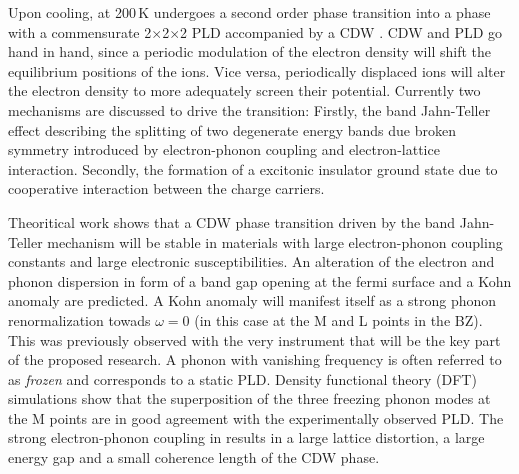 Upon cooling, at 200\,K \cite{disalvo1976} \ts\space undergoes a second order phase transition into a phase with a commensurate 2$\times$2$\times$2 \ac{PLD} accompanied by a \ac{CDW} \cite{rossnagel2011}.
\ac{CDW} and \ac{PLD} go hand in hand, since a periodic modulation of the electron density will shift the equilibrium positions of the ions.
Vice versa, periodically displaced ions will alter the electron density to more adequately screen their potential.
Currently two mechanisms are discussed to drive the transition: 
Firstly, the band Jahn-Teller effect describing the splitting of two degenerate energy bands due broken symmetry introduced by electron-phonon coupling and electron-lattice interaction\cite{JT}.
Secondly, the formation of a excitonic insulator ground state due to cooperative interaction between the charge carriers\cite{EI}.

Theoritical work shows that a \ac{CDW} phase transition driven by the band Jahn-Teller mechanism will be stable in materials with large electron-phonon coupling constants and large electronic susceptibilities\cite{friend1979}.
An alteration of the electron and phonon dispersion in form of a band gap opening at the fermi surface and a Kohn anomaly are predicted.
A Kohn anomaly will manifest itself as a strong phonon renormalization towads $\omega=0$\cite{kohn1959} (in this case at the M and L points in the \ac{BZ}).
This was previously observed with the very instrument that will be the key part of the proposed research\cite{otto2021}.
A phonon with vanishing frequency is often referred to as \emph{frozen} and corresponds to a static \ac{PLD}.
Density functional theory (DFT) simulations show that the superposition of the three freezing phonon modes at the M points are in good agreement with the experimentally observed \ac{PLD}\cite{kaneko2018}. %
The strong electron-phonon coupling in \ts\space results in a large lattice distortion, a large energy gap and a small coherence length of the \ac{CDW} phase\cite{haas1978,hildebrand2016}.


